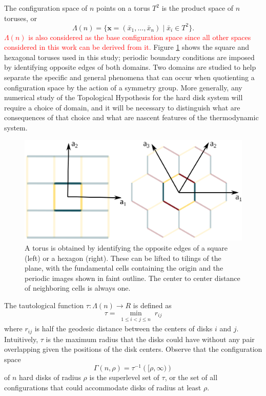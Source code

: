 \documentclass[default,iicol]{sn-jnl}%
\theoremstyle{thmstyleone}%
\theoremstyle{thmstyletwo}%
\theoremstyle{thmstylethree}%
\renewcommand{\vec}[1]{\bar{#1}}
\providecommand{\config}[1]{\mathbf{#1}}
\providecommand{\red}[1]{\textcolor{red}{#1}}
\begin{document}
The configuration space of $n$ points on a torus $T^2$ is the product space of $n$ toruses, or 
\begin{equation*}
\Lambda(n) = \{ \config{x} = (\vec{x}_1, \dots ,\vec{x}_n) \;\vert\; \vec{x}_i \in T^2 \}.
\label{eq:configuration_space1}
\end{equation*}
\red{$\Lambda(n)$ is also considered as the base configuration space since all other spaces considered in this work can be derived from it.} Figure \ref{fig:figure2} shows the square and hexagonal toruses used in this study; periodic boundary conditions are imposed by identifying opposite edges of both domains. Two domains are studied to help separate the specific and general phenomena that can occur when quotienting a configuration space by the action of a symmetry group. More generally, any numerical study of the Topological Hypothesis for the hard disk system will require a choice of domain, and it will be necessary to distinguish what are consequences of that choice and what are nascent features of the thermodynamic system.

\begin{figure}
	\centering
	\includegraphics[width=0.9\columnwidth]{figure2.eps}
	\caption{A torus is obtained by identifying the opposite edges of a square (left) or a hexagon (right). These can be lifted to tilings of the plane, with the fundamental cells containing the origin and the periodic images shown in faint outline. The center to center distance of neighboring cells is always one.}
	\label{fig:figure2}
\end{figure}

The tautological function $\tau: \Lambda(n) \rightarrow R$ is defined as
\begin{equation*}
\tau = \min\limits_{\substack{1 \leq i < j \leq n}} {r_{ij}}
\label{eq:tautological_function}
\end{equation*}
where $r_{ij}$ is half the geodesic distance between the centers of disks $i$ and $j$. Intuitively, $\tau$ is the maximum radius that the disks could have without any pair overlapping given the positions of the disk centers. Observe that the configuration space
\begin{equation}
\Gamma(n,\rho) = \tau^{-1}\left([\rho,\infty)\right)
\label{eq:configuration_space2}
\end{equation}
of $n$ hard disks of radius $\rho$ is the superlevel set of $\tau$, or the set of all configurations that could accommodate disks of radius at least $\rho$.
\end{document}
